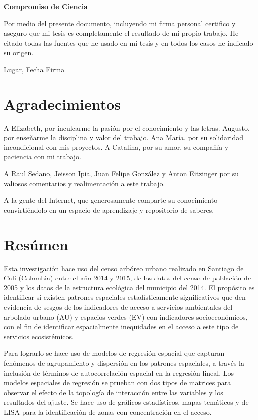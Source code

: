 \documentclass[12pt,a4paper,openany]{book}
\title{}
\author{}
\date{}
\theoremstyle{definition}
\theoremstyle{definition}
\theoremstyle{definition}
\theoremstyle{remark}
\begin{document}
% 


\textbf{Compromiso de Ciencia}

Por medio del presente documento, incluyendo mi firma personal certifico
y aseguro que mi tesis es completamente el resultado de mi propio
trabajo. He citado todas las fuentes que he usado en mi tesis y en todos
los casos he indicado su origen.

\bigskip
\hrulefill 

Lugar, Fecha \hfill Firma

\chapter*{Agradecimientos}\label{agradecimientos}

A Elizabeth, por inculcarme la pasión por el conocimiento y las letras.
Augusto, por enseñarme la disciplina y valor del trabajo. Ana María, por
su solidaridad incondicional con mis proyectos. A Catalina, por su amor,
su compañía y paciencia con mi trabajo.

A Raul Sedano, Jeisson Ipia, Juan Felipe González y Anton Eitzinger por
su valiosos comentarios y realimentación a este trabajo.

A la gente del Internet, que generosamente comparte su conocimiento
convirtiéndolo en un espacio de aprendizaje y repositorio de saberes.


\chapter*{Resúmen}\label{resuxfamen}


Esta investigación hace uso del censo arbóreo urbano realizado en
Santiago de Cali (Colombia) entre el año 2014 y 2015, de los datos del
censo de población de 2005 y los datos de la estructura ecológica del
municipio del 2014. El propósito es identificar si existen patrones
espaciales estadísticamente significativos que den evidencia de sesgos
de los indicadores de acceso a servicios ambientales del arbolado urbano
(AU) y espacios verdes (EV) con indicadores socioeconómicos, con el fin
de identificar espacialmente inequidades en el acceso a este tipo de
servicios ecosistémicos.

Para lograrlo se hace uso de modelos de regresión espacial que capturan
fenómenos de agrupamiento y dispersión en los patrones espaciales, a
través la inclusión de términos de autocorrelación espacial en la
regresión lineal. Los modelos espaciales de regresión se prueban con dos
tipos de matrices para observar el efecto de la topología de interacción
entre las variables y los resultados del ajuste. Se hace uso de gráficos
estadísticos, mapas temáticos y de LISA para la identificación de zonas
con concentración en el acceso.
\end{document}
